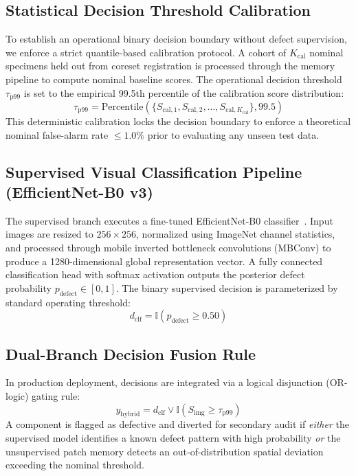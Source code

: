 \documentclass[journal]{IEEEtran}
\begin{document}
\subsection{Statistical Decision Threshold Calibration}
To establish an operational binary decision boundary without defect supervision, we enforce a strict quantile-based calibration protocol. A cohort of $K_{\text{cal}}$ nominal specimens held out from coreset registration is processed through the memory pipeline to compute nominal baseline scores. The operational decision threshold $\tau_{\text{p99}}$ is set to the empirical 99.5th percentile of the calibration score distribution:
\begin{equation}
\tau_{\text{p99}} = \text{Percentile}\left(\{S_{\text{cal},1}, S_{\text{cal},2}, \dots, S_{\text{cal},K_{\text{cal}}}\}, 99.5\right)
\end{equation}
This deterministic calibration locks the decision boundary to enforce a theoretical nominal false-alarm rate $\le 1.0\%$ prior to evaluating any unseen test data.

\subsection{Supervised Visual Classification Pipeline (EfficientNet-B0 v3)}
The supervised branch executes a fine-tuned EfficientNet-B0 classifier~\cite{tan2019efficientnet}. Input images are resized to $256 \times 256$, normalized using ImageNet channel statistics, and processed through mobile inverted bottleneck convolutions (MBConv) to produce a 1280-dimensional global representation vector. A fully connected classification head with softmax activation outputs the posterior defect probability $p_{\text{defect}} \in [0, 1]$. The binary supervised decision is parameterized by standard operating threshold:
\begin{equation}
d_{\text{clf}} = \mathbb{I}(p_{\text{defect}} \ge 0.50)
\end{equation}

\subsection{Dual-Branch Decision Fusion Rule}
In production deployment, decisions are integrated via a logical disjunction (OR-logic) gating rule:
\begin{equation}
y_{\text{hybrid}} = d_{\text{clf}} \lor \mathbb{I}(S_{\text{img}} \ge \tau_{\text{p99}})
\end{equation}
A component is flagged as defective and diverted for secondary audit if \textit{either} the supervised model identifies a known defect pattern with high probability \textit{or} the unsupervised patch memory detects an out-of-distribution spatial deviation exceeding the nominal threshold.
\end{document}
